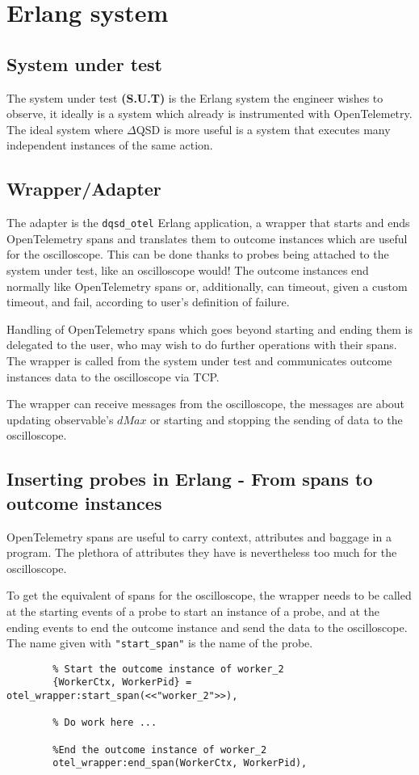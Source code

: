\section{Erlang system} 
    
    \subsection{System under test} The system under test \textbf{(S.U.T)} is the Erlang system the engineer wishes to observe, it ideally is a system which already is instrumented with OpenTelemetry. The ideal system where $\Delta$QSD is more useful is a system that executes many independent instances of the same action. 
    
    \subsection{Wrapper/Adapter} The adapter is the \texttt{dqsd\_otel} Erlang application, a wrapper that starts and ends OpenTelemetry spans and translates them to outcome instances which are useful for the oscilloscope. This can be done thanks to probes being attached to the system under test, like an oscilloscope would! The outcome instances end normally like OpenTelemetry spans or, additionally, can timeout, given a custom timeout, and fail, according to user's definition of failure. 
    
    Handling of OpenTelemetry spans which goes beyond starting and ending them is delegated to the user, who may wish to do further operations with their spans. 
    The wrapper is called from the system under test and communicates outcome instances data to the oscilloscope via TCP. 
    
    The wrapper can receive messages from the oscilloscope, the messages are about updating observable's $dMax$ or starting and stopping the sending of data to the oscilloscope.
    \subsection{Inserting probes in Erlang - From spans to outcome instances}
        OpenTelemetry spans are useful to carry context, attributes and baggage in a program. The plethora of attributes they have is nevertheless too much for the oscilloscope.

        To get the equivalent of spans for the oscilloscope, the wrapper needs to be called at the starting events of a probe to start an instance of a probe, and at the ending events to end the outcome instance and send the data to the oscilloscope. The name given with \texttt{"start\_span"} is the name of the probe.

        \begin{verbatim}
        % Start the outcome instance of worker_2 
        {WorkerCtx, WorkerPid} = otel_wrapper:start_span(<<"worker_2">>),
        
        % Do work here ...

        %End the outcome instance of worker_2
        otel_wrapper:end_span(WorkerCtx, WorkerPid),
        \end{verbatim}
